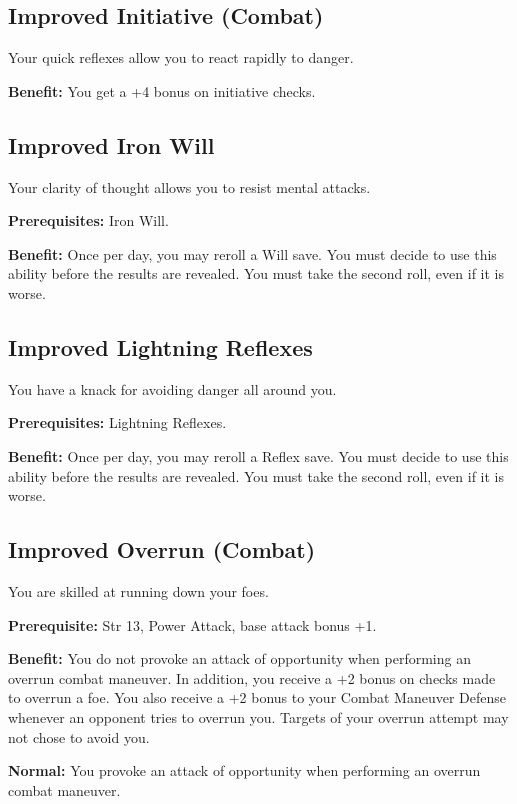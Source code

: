\subsection{Improved Initiative (Combat)}

				
Your quick reflexes allow you to react rapidly to danger.
				
\textbf{Benefit:} You get a +4 bonus on initiative checks.
				
\subsection{Improved Iron Will}

				
Your clarity of thought allows you to resist mental attacks.
				
\textbf{Prerequisites:} Iron Will.
				
\textbf{Benefit:} Once per day, you may reroll a Will save. You must decide to use this ability before the results are revealed. You must take the second roll, even if it is worse.
				
\subsection{Improved Lightning Reflexes}

				
You have a knack for avoiding danger all around you.
				
\textbf{Prerequisites:} Lightning Reflexes.
				
\textbf{Benefit:} Once per day, you may reroll a Reflex save. You must decide to use this ability before the results are revealed. You must take the second roll, even if it is worse.
				
\subsection{Improved Overrun (Combat)}

				
You are skilled at running down your foes.
				
\textbf{Prerequisite:} Str 13, Power Attack, base attack bonus +1.
				
\textbf{Benefit:} You do not provoke an attack of opportunity when performing an overrun combat maneuver. In addition, you receive a +2 bonus on checks made to overrun a foe. You also receive a +2 bonus to your Combat Maneuver Defense whenever an opponent tries to overrun you. Targets of your overrun attempt may not chose to avoid you.
				
\textbf{Normal:} You provoke an attack of opportunity when performing an overrun combat maneuver.
				
